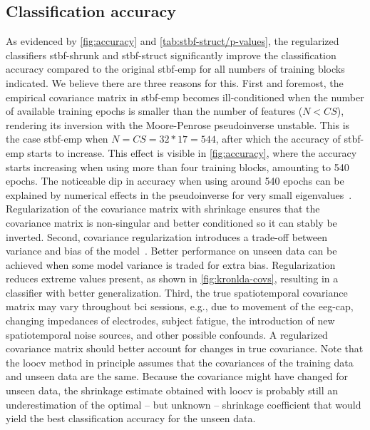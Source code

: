 	\subsection{Classification accuracy}
	As evidenced by \cref{fig:accuracy} and \cref{tab:stbf-struct/p-values},
  the regularized classifiers \ac{stbf-shrunk}
	and \ac{stbf-struct} significantly improve the classification accuracy
	compared to the original \ac{stbf-emp} for all numbers of training blocks
  indicated.
	We believe there are three reasons for this.
	First and foremost, the empirical covariance matrix in \ac{stbf-emp} becomes
	ill-conditioned when the number of available training epochs is smaller than
	the number of features ($N<CS$), rendering its inversion with the
	Moore-Penrose pseudoinverse unstable.
	This is the case \ac{stbf-emp} when $N=CS=32*17=544$, after which the
	accuracy of \ac{stbf-emp} starts to increase.
	This effect is visible in \cref{fig:accuracy}, where the accuracy starts
	increasing when using more than four training blocks, amounting to 540 epochs.
	The noticeable dip in accuracy when using around 540 epochs can be explained by
	numerical effects in the pseudoinverse for very small
	eigenvalues~\cite{Blankertz2011, Raudys1998, Schaefer2004,
		Kraemer2009}.
	Regularization of the covariance matrix with shrinkage ensures that the
	covariance matrix is non-singular and better conditioned so it can stably be inverted.
	Second, covariance regularization introduces a trade-off between variance and bias of the model~\cite{Ledoit2004}.
	Better performance on unseen data can be achieved when some model variance is
	traded for extra bias.
	Regularization reduces extreme values present, as shown in
	\cref{fig:kronlda-covs}, resulting in a classifier with
	better generalization.
	Third, the true spatiotemporal covariance matrix may vary throughout \ac{bci}
	sessions, e.g., due to movement of the \ac{eeg}-cap, changing impedances of
	electrodes, subject fatigue, the introduction of new spatiotemporal noise
	sources, and other possible confounds.
	A regularized covariance matrix should better account for changes in true covariance.
	Note that the \ac{loocv} method in principle assumes that the covariances of
	the training data and unseen data are the same.
	Because the covariance might have changed for unseen data, the shrinkage
	estimate obtained with \ac{loocv} is probably still an
	underestimation of the optimal -- but unknown -- shrinkage coefficient that
	would yield the best classification accuracy for the unseen data.


